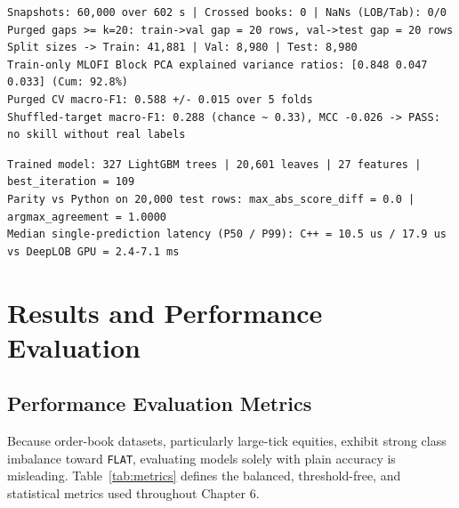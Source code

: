 \documentclass[12pt,a4paper,oneside]{report}
\newcommand{\code}[1]{\texttt{#1}}
\begin{document}
\begin{lstlisting}[style=console, caption={Live pipeline preprocessing, Block PCA variance, and anti-leakage output executed inside the submission Jupyter notebook.}, label={lst:nb}]
Snapshots: 60,000 over 602 s | Crossed books: 0 | NaNs (LOB/Tab): 0/0
Purged gaps >= k=20: train->val gap = 20 rows, val->test gap = 20 rows
Split sizes -> Train: 41,881 | Val: 8,980 | Test: 8,980
Train-only MLOFI Block PCA explained variance ratios: [0.848 0.047 0.033] (Cum: 92.8%)
Purged CV macro-F1: 0.588 +/- 0.015 over 5 folds
Shuffled-target macro-F1: 0.288 (chance ~ 0.33), MCC -0.026 -> PASS: no skill without real labels
\end{lstlisting}

\begin{lstlisting}[style=console, caption={Verified C++17 decision-tree compilation output on 20,000 BTC test rows.}, label={lst:cpp}]
Trained model: 327 LightGBM trees | 20,601 leaves | 27 features | best_iteration = 109
Parity vs Python on 20,000 test rows: max_abs_score_diff = 0.0 | argmax_agreement = 1.0000
Median single-prediction latency (P50 / P99): C++ = 10.5 us / 17.9 us vs DeepLOB GPU = 2.4-7.1 ms
\end{lstlisting}

\chapter{Results and Performance Evaluation}

\section{Performance Evaluation Metrics}

Because order-book datasets, particularly large-tick equities, exhibit strong class imbalance toward \code{FLAT}, evaluating models solely with plain accuracy is misleading. Table~\ref{tab:metrics} defines the balanced, threshold-free, and statistical metrics used throughout Chapter 6.
\end{document}
